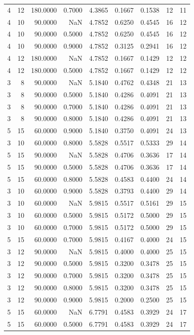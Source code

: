\begin{tabular}{rrrrrrrrr}
4 & 12 & 180.0000 & 0.7000 & 4.3865 & 0.1667 & 0.1538 & 12 & 11 \\
4 & 10 & 90.0000 & NaN & 4.7852 & 0.6250 & 0.4545 & 16 & 12 \\
4 & 10 & 90.0000 & 0.5000 & 4.7852 & 0.6250 & 0.4545 & 16 & 12 \\
4 & 10 & 90.0000 & 0.9000 & 4.7852 & 0.3125 & 0.2941 & 16 & 12 \\
4 & 12 & 180.0000 & NaN & 4.7852 & 0.1667 & 0.1429 & 12 & 12 \\
4 & 12 & 180.0000 & 0.5000 & 4.7852 & 0.1667 & 0.1429 & 12 & 12 \\
3 & 8 & 90.0000 & NaN & 5.1840 & 0.4762 & 0.4348 & 21 & 13 \\
3 & 8 & 90.0000 & 0.5000 & 5.1840 & 0.4286 & 0.4091 & 21 & 13 \\
3 & 8 & 90.0000 & 0.7000 & 5.1840 & 0.4286 & 0.4091 & 21 & 13 \\
3 & 8 & 90.0000 & 0.8000 & 5.1840 & 0.4286 & 0.4091 & 21 & 13 \\
5 & 15 & 60.0000 & 0.9000 & 5.1840 & 0.3750 & 0.4091 & 24 & 13 \\
3 & 10 & 60.0000 & 0.8000 & 5.5828 & 0.5517 & 0.5333 & 29 & 14 \\
5 & 15 & 90.0000 & NaN & 5.5828 & 0.4706 & 0.3636 & 17 & 14 \\
5 & 15 & 90.0000 & 0.5000 & 5.5828 & 0.4706 & 0.3636 & 17 & 14 \\
5 & 15 & 60.0000 & 0.8000 & 5.5828 & 0.4583 & 0.4400 & 24 & 14 \\
3 & 10 & 60.0000 & 0.9000 & 5.5828 & 0.3793 & 0.4400 & 29 & 14 \\
3 & 10 & 60.0000 & NaN & 5.9815 & 0.5517 & 0.5161 & 29 & 15 \\
3 & 10 & 60.0000 & 0.5000 & 5.9815 & 0.5172 & 0.5000 & 29 & 15 \\
3 & 10 & 60.0000 & 0.7000 & 5.9815 & 0.5172 & 0.5000 & 29 & 15 \\
5 & 15 & 60.0000 & 0.7000 & 5.9815 & 0.4167 & 0.4000 & 24 & 15 \\
3 & 12 & 90.0000 & NaN & 5.9815 & 0.4000 & 0.4000 & 25 & 15 \\
3 & 12 & 90.0000 & 0.5000 & 5.9815 & 0.3200 & 0.3478 & 25 & 15 \\
3 & 12 & 90.0000 & 0.7000 & 5.9815 & 0.3200 & 0.3478 & 25 & 15 \\
3 & 12 & 90.0000 & 0.8000 & 5.9815 & 0.3200 & 0.3478 & 25 & 15 \\
3 & 12 & 90.0000 & 0.9000 & 5.9815 & 0.2000 & 0.2500 & 25 & 15 \\
5 & 15 & 60.0000 & NaN & 6.7791 & 0.4583 & 0.3929 & 24 & 17 \\
5 & 15 & 60.0000 & 0.5000 & 6.7791 & 0.4583 & 0.3929 & 24 & 17 \\
\bottomrule
\end{tabular}
